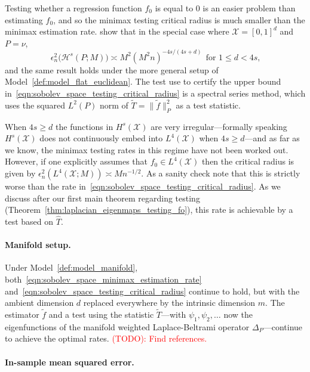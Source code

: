 \documentclass{article}
\newcommand{\1}{\mathbf{1}}
\newcommand{\Xset}{\mathcal{X}}
\newcommand{\Leb}{L}
\newcommand{\mc}[1]{\mathcal{#1}}
\newcommand{\wt}[1]{\widetilde{#1}}
\newcommand{\wh}[1]{\widehat{#1}}
\theoremstyle{alden}
\theoremstyle{aldenthm}
\theoremstyle{definition}
\theoremstyle{remark}
\begin{document}
Testing whether a regression function $f_0$ is equal to $0$ is an easier problem than estimating $f_0$, and so the minimax testing critical radius is much smaller than the minimax estimation rate. \citet{ingster2009} show that in the special case where $\mc{X} = [0,1]^d$ and $P = \nu$,
\begin{equation}
\label{eqn:sobolev_space_testing_critical_radius}
\epsilon_n^2\bigl(\mc{H}^s(P;M)\bigr) \asymp M^2(M^2n)^{-4s/(4s + d)}~~\textrm{for $1 \leq d < 4s$,}
\end{equation}
and the same result holds under the more general setup of Model~\ref{def:model_flat_euclidean}. The test \citet{ingster2009} use to certify the upper bound in~\eqref{eqn:sobolev_space_testing_critical_radius} is a spectral series method, which uses the squared $L^2(P)$ norm of $\wt{T} = \|\wt{f}\|_{P}^2$ as a test statistic. 

When $4s \geq d$ the functions in $H^s(\Xset)$ are very irregular---formally speaking $H^s(\Xset)$ does not continuously embed into $\Leb^4(\Xset)$ when $4s \geq d$---and as far as we know, the minimax testing rates in this regime have not been worked out. However, if one explicitly assumes that $f_0 \in \Leb^4(\mc{X})$ then the critical radius is given by $\epsilon_n^2(\Leb^4(\mc{X};M)) \asymp Mn^{-1/2}$. As a sanity check note that this is strictly worse than the rate in~\eqref{eqn:sobolev_space_testing_critical_radius}. As we discuss after our first main theorem regarding testing (Theorem~\ref{thm:laplacian_eigenmaps_testing_fo}), this rate is achievable by a test based on $\wh{T}$.

\paragraph{Manifold setup.}
Under Model~\ref{def:model_manifold}, both~\eqref{eqn:sobolev_space_minimax_estimation_rate} and~\eqref{eqn:sobolev_space_testing_critical_radius} continue to hold, but with the ambient dimension $d$ replaced everywhere by the intrinsic dimension $m$. The estimator $\wt{f}$ and a test using the statistic $\wt{T}$---with $\psi_1,\psi_2,\ldots$ now the eigenfunctions of the manifold weighted Laplace-Beltrami operator $\Delta_P$---continue to achieve the optimal rates. \textcolor{red}{(TODO): Find references.}

\paragraph{In-sample mean squared error.}
\end{document}
